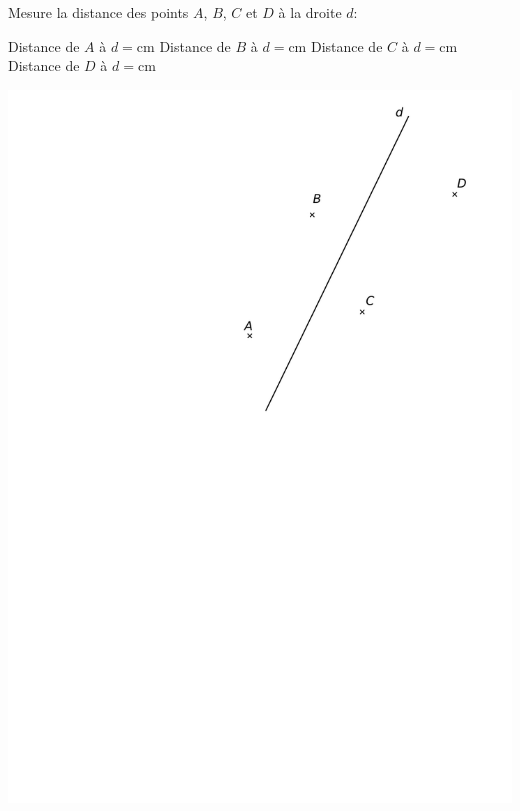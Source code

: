 \documentclass[a4paper,11pt]{report}
\begin{document}
\begin{exop}
{Mesure la distance des points $A$, $B$, $C$ et $D$ à la droite $d$:

	\begin{minipage}[t]{0.5\textwidth}{
	\vspace{0pt}	
\begin{tasks}
    \task Distance de $A$ à $d=$cm
    \task Distance de $B$ à $d=$cm
    \task Distance de $C$ à $d=$cm
    \task Distance de $D$ à $d=$cm
\end{tasks}
	}
	\end{minipage}
	\begin{minipage}[t]{0.5\textwidth}{
	\vspace{0pt}
\begin{center}
\includegraphics[scale=0.7]{media/es-11/13-14}
\end{center}	}

\end{minipage}}
\end{exop}
\end{document}
